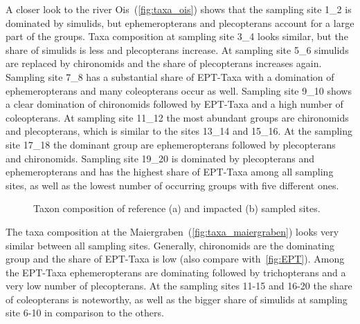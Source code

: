 A closer look to the river Ois~(\cref{fig:taxa_ois}) shows that the sampling site {1\_2} is dominated by simulids, but ephemeropterans and plecopterans account for a large part of the groups. Taxa composition at sampling site 3\_4 looks similar, but the share of simulids is less and plecopterans increase. At sampling site {5\_6} simulids are replaced by chironomids and the share of plecopterans increases again. Sampling site {7\_8} has a substantial share of EPT-Taxa with a domination of ephemeropterans and many coleopterans occur as well. Sampling site {9\_10} shows a clear domination of chironomids followed by EPT-Taxa and a high number of coleopterans. At sampling site {11\_12} the most abundant groups are chironomids and plecopterans, which is similar to the sites 13\_14 and 15\_16. At the sampling site {17\_18} the dominant group are ephemeropterans followed by plecopterans and chironomids. Sampling site {19\_20} is dominated by plecopterans and ephemeropterans and has the highest share of EPT-Taxa among all sampling sites, as well as the lowest number of occurring groups with five different ones.


\begin{figure}[!htb]                                    %
\centering                                                                  %
  \hfill                                                                                    %
  \hspace*{\fill}                                                                           %
\caption{Taxon composition of reference (a) and impacted (b) sampled sites.}\label{fig:taxa_composition}          %
\end{figure}

The taxa composition at the Maiergraben~(\cref{fig:taxa_maiergraben}) looks very similar between all sampling sites. Generally, chironomids are the dominating group and the share of EPT-Taxa is low (also compare with~\cref{fig:EPT}). Among the EPT-Taxa ephemeropterans are dominating followed by trichopterans and a very low number of plecopterans. At the sampling sites 11-15 and 16-20 the share of coleopterans is noteworthy, as well as the bigger share of simulids at sampling site 6-10 in comparison to the others.






